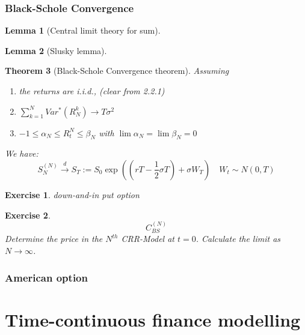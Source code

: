 \documentclass[a4paper,11pt]{book}
\newtheorem{theorem}{Theorem}[section]
\newtheorem{lemma}[theorem]{Lemma}
\newtheorem{exercise}{Exercise}[subsection]
\theoremstyle{definition}
\theoremstyle{remark}
\begin{document}
\subsubsection*{Black-Schole Convergence}
\begin{lemma}[Central limit theory for sum]
\end{lemma}

\begin{lemma}[Slusky lemma]
\end{lemma}

\begin{theorem}[Black-Schole Convergence theorem]
Assuming
\begin{enumerate}
	\item the returns are i.i.d., (clear from 2.2.1)
	\item $\sum_{k = 1}^N Var^*(R_N^k) \rightarrow T\sigma^2$
	\item $-1 \leq \alpha_N \leq R^N_t \leq \beta_N$ with $\lim \alpha_N = \lim \beta_N = 0$
\end{enumerate}
We have:
\begin{equation*}
	S^{(N)}_{N} \overset{d}{\longrightarrow} S_T:= S_0\exp\left((rT - \frac{1}{2}\sigma T) + \sigma W_T \right) \quad W_t \sim N(0, T) 
\end{equation*}
\end{theorem}

\begin{exercise}
	down-and-in put option
\end{exercise}

\begin{exercise}
	\begin{equation*}
		C_{BS}^{(N)}
	\end{equation*}
	Determine the price in the $N^{th}$ CRR-Model at $t = 0$. Calculate the limit as $N \rightarrow \infty$. 
\end{exercise}


\subsubsection{American option}




\newpage
\section{Time-continuous finance modelling}
\end{document}
